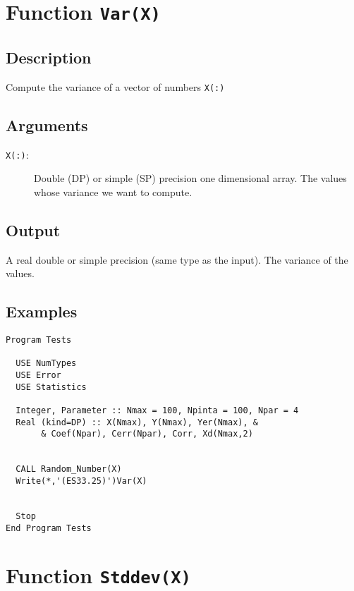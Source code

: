 \section{Function \texttt{Var(X)}}

\subsection{Description}

Compute the variance of a vector of numbers \texttt{X(:)}

\subsection{Arguments}

\begin{description}
\item[\texttt{X(:)}:] Double (DP) or simple (SP) precision one
  dimensional array. The values  whose variance we want to compute.
\end{description}

\subsection{Output}

A real double or simple precision (same type as the input). The
variance of the values.

\subsection{Examples}

\begin{verbatim}
Program Tests

  USE NumTypes
  USE Error
  USE Statistics

  Integer, Parameter :: Nmax = 100, Npinta = 100, Npar = 4
  Real (kind=DP) :: X(Nmax), Y(Nmax), Yer(Nmax), &
       & Coef(Npar), Cerr(Npar), Corr, Xd(Nmax,2)


  CALL Random_Number(X)
  Write(*,'(ES33.25)')Var(X)


  Stop
End Program Tests
\end{verbatim}


\section{Function \texttt{Stddev(X)}}

